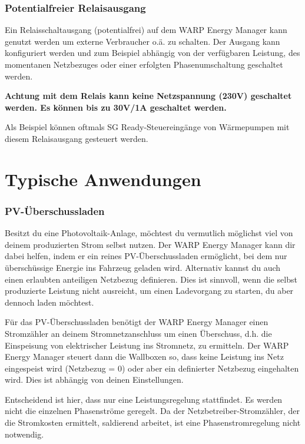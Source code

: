 \documentclass[a4paper,10pt]{article}
\begin{document}
\begin{multicols*}{2}
	\subsubsection{Potentialfreier Relaisausgang}
	Ein Relaisschaltausgang (potentialfrei) auf dem WARP Energy Manager kann
	genutzt werden um externe Verbraucher o.ä. zu schalten. Der Ausgang kann
	konfiguriert werden und zum Beispiel abhängig von der verfügbaren Leistung,
	des momentanen Netzbezuges oder einer erfolgten Phasenumschaltung geschaltet
	werden.

	\textbf{Achtung mit dem Relais kann keine Netzspannung (230V) geschaltet
	werden. Es können bis zu 30V/1A geschaltet werden.}

	Als Beispiel können oftmals SG Ready-Steuereingänge von Wärmepumpen mit
	diesem Relaisausgang gesteuert werden.


	\section{Typische Anwendungen}

	\subsubsection{PV-Überschussladen}
	\label{pv_ueberschussladen}

	Besitzt du eine Photovoltaik-Anlage, möchtest du vermutlich möglichst viel
	von deinem produzierten Strom selbst nutzen. Der WARP Energy Manager kann
	dir dabei helfen, indem er ein reines PV-Überschussladen ermöglicht, bei
	dem nur überschüssige Energie ins Fahrzeug geladen wird. Alternativ kannst
	du auch einen erlaubten anteiligen Netzbezug definieren. Dies ist sinnvoll,
	wenn die selbst produzierte Leistung nicht ausreicht, um einen Ladevorgang
	zu starten, du aber dennoch laden möchtest.

	Für das PV-Überschussladen benötigt der WARP Energy Manager einen Stromzähler
	an deinem Stromnetzanschluss um einen Überschuss, d.h. die Einspeisung von
	elektrischer Leistung ins Stromnetz, zu ermitteln. Der WARP Energy Manager
	steuert dann die Wallboxen so, dass keine Leistung ins Netz eingespeist wird
	(Netzbezug = 0) oder aber ein definierter Netzbezug eingehalten wird. Dies
	ist abhängig von deinen Einstellungen.

	Entscheidend ist hier, dass nur eine Leistungsregelung stattfindet. Es werden
	nicht die einzelnen Phasenströme geregelt. Da der Netzbetreiber-Stromzähler,
	der die Stromkosten ermittelt, saldierend arbeitet, ist eine
	Phasenstromregelung nicht notwendig.


\end{multicols*}
\end{document}
